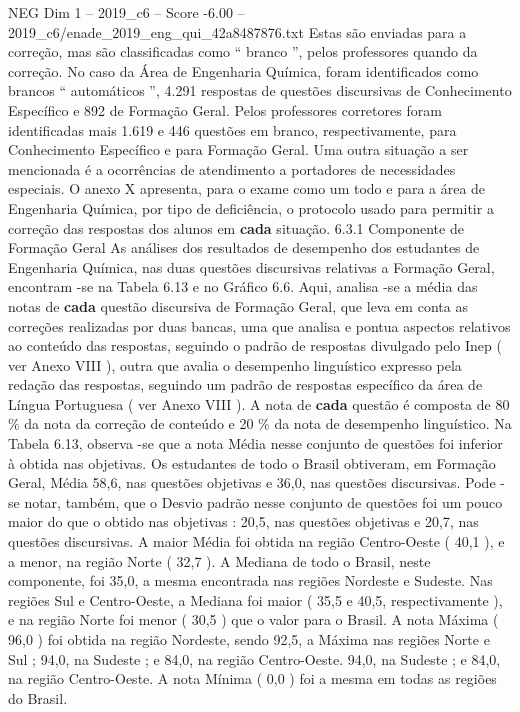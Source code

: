 \begin{textsample}{NEG Dim 1 – 2019\_c6 – Score -6.00 – 2019\_c6/enade\_2019\_eng\_qui\_42a8487876.txt}
Estas são enviadas para a correção, mas são classificadas como “ branco ”, pelos professores quando da correção.
No caso da Área de Engenharia Química, foram identificados como brancos “ automáticos ”, 4.291 respostas de questões discursivas de Conhecimento Específico e 892 de Formação Geral.
Pelos professores corretores foram identificadas mais 1.619 e 446 questões em branco, respectivamente, para Conhecimento Específico e para Formação Geral.
Uma outra situação a ser mencionada é a ocorrências de atendimento a portadores de necessidades especiais.
O anexo X apresenta, para o exame como um todo e para a área de Engenharia Química, por tipo de deficiência, o protocolo usado para permitir a correção das respostas dos alunos em \textbf{cada} situação. 6.3.1 Componente de Formação Geral As análises dos resultados de desempenho dos estudantes de Engenharia Química, nas duas questões discursivas relativas a Formação Geral, encontram -se na Tabela 6.13 e no Gráfico 6.6.
Aqui, analisa -se a média das notas de \textbf{cada} questão discursiva de Formação Geral, que leva em conta as correções realizadas por duas bancas, uma que analisa e pontua aspectos relativos ao conteúdo das respostas, seguindo o padrão de respostas divulgado pelo Inep ( ver Anexo VIII ), outra que avalia o desempenho linguístico expresso pela redação das respostas, seguindo um padrão de respostas específico da área de Língua Portuguesa ( ver Anexo VIII ).
A nota de \textbf{cada} questão é composta de 80 \% da nota da correção de conteúdo e 20 \% da nota de desempenho linguístico.
Na Tabela 6.13, observa -se que a nota Média nesse conjunto de questões foi inferior à obtida nas objetivas.
Os estudantes de todo o Brasil obtiveram, em Formação Geral, Média 58,6, nas questões objetivas e 36,0, nas questões discursivas.
Pode -se notar, também, que o Desvio padrão nesse conjunto de questões foi um pouco maior do que o obtido nas objetivas : 20,5, nas questões objetivas e 20,7, nas questões discursivas.
A maior Média foi obtida na região Centro-Oeste ( 40,1 ), e a menor, na região Norte ( 32,7 ).
A Mediana de todo o Brasil, neste componente, foi 35,0, a mesma encontrada nas regiões Nordeste e Sudeste.
Nas regiões Sul e Centro-Oeste, a Mediana foi maior ( 35,5 e 40,5, respectivamente ), e na região Norte foi menor ( 30,5 ) que o valor para o Brasil.
A nota Máxima ( 96,0 ) foi obtida na região Nordeste, sendo 92,5, a Máxima nas regiões Norte e Sul ; 94,0, na Sudeste ; e 84,0, na região Centro-Oeste. 94,0, na Sudeste ; e 84,0, na região Centro-Oeste.
A nota Mínima ( 0,0 ) foi a mesma em todas as regiões do Brasil.

\end{textsample}
